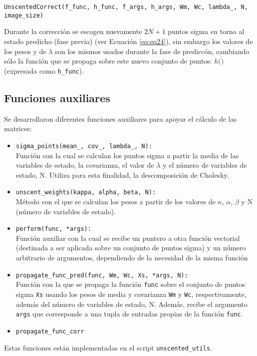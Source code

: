 \bigskip
\begin{center}
\texttt{UnscentedCorrect(f\_func, h\_func, f\_args, h\_args,  Wm, Wc, lambda\_, N, image\_size)}
\end{center}




Durante la correcci\'on se escogen nuevamente $2N+1$ puntos sigma en torno al estado predicho (fase previa) (ver Ecuaci\'on \ref{eq:eq24}), sin embargo los valores de los pesos y de $\lambda$ son los mismos usados durante la fase de predicc\'on, cambiando s\'olo la funci\'on que se propaga sobre este nuevo conjunto de puntos: $h(\dot)$ (expresada como \texttt{h\_func}). 
\bigskip

\subsection{Funciones auxiliares}
Se desarrollaron diferentes funciones auxiliares para apoyar el c\'alculo de las matrices:
\begin{itemize}
\item \texttt{sigma\_points(mean\_, cov\_, lambda\_, N):}\\
Funci\'on con la cual se calculan los puntos sigma a partir la media de las variables de estado, la covarianza, el valor de $\lambda$ y el n\'umero de variables de estado, N. Utiliza para esta finalidad, la descomposici\'on de Cholesky.
\item \texttt{unscent\_weights(kappa, alpha, beta, N):}\\
M\'etodo con el que se calculan los pesos a partir de los valores de $\kappa$, $\alpha$, $\beta$ y N (n\'umero de variables de estado). 
\item \texttt{perform(func, *args):}\\
Funci\'on auxiliar con la cual se recibe un puntero a otra funci\'on vectorial (destinada a ser aplicada sobre un conjunto de puntos sigma) y un n\'umero arbitrario de argumentos, dependiendo de la necesidad de la misma funci\'on
\item \texttt{propagate\_func\_pred(func, Wm, Wc, Xs, *args, N):}\\
Funci\'on con la que se propaga la funci\'on \texttt{func} sobre el conjunto de puntos sigma \texttt{Xs} usando los pesos de media y covarianza \texttt{Wm} y \texttt{Wc}, respectivamente, adem\'as del n\'umero de variables de estado, N. Adem\'as, recibe el argumento \texttt{args} que corresponde a una tupla de entradas propias de la funci\'on \texttt{func}. 
\item \texttt{propagate\_func\_corr}
\end{itemize}

Estas funciones est\'an implementadas en el script \texttt{unscented\_utils}.

